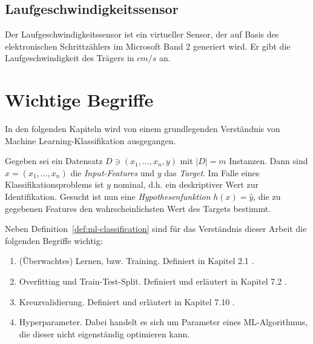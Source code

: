 \subsection{Laufgeschwindigkeitssensor}
Der Laufgeschwindigkeitssensor ist ein virtueller Sensor, der auf Basis des elektronischen Schrittzählers im Microsoft Band 2 generiert wird. Er gibt die Laufgeschwindigkeit des Trägers in $cm/s$ an.

\section{Wichtige Begriffe}
In den folgenden Kapiteln wird von einem grundlegenden Verständnis von Machine Learning-Klassifikation ausgegangen.

\begin{definition}[ML-Klassifikation]
\label{def:ml-classification}
Gegeben sei ein Datensatz $D \ni (x_1, ..., x_n, y)$ mit $|D| = m$ Instanzen. Dann sind $x = (x_1, ..., x_n)$ die \textit{Input-Features} und $y$ das \textit{Target}. Im Falle eines Klassifikationsproblems ist $y$ nominal, d.h. ein deskriptiver Wert zur Identifikation. Gesucht ist nun eine \textit{Hypothesenfunktion} $h(x) = \hat{y}$, die zu gegebenen Features den wahrscheinlichsten Wert des Targets bestimmt\cite{Ng2011a}.
\end{definition}
Neben Definition~\ref{def:ml-classification} sind für das Verständnis dieser Arbeit die folgenden Begriffe wichtig:
\begin{enumerate}
\item (Überwachtes) Lernen, bzw. Training. Definiert in Kapitel 2.1 \cite{Hastie2009}.
\item Overfitting und Train-Test-Split. Definiert und erläutert in Kapitel 7.2 \cite{Hastie2009}.
\item Kreuzvalidierung. Definiert und erläutert in Kapitel 7.10 \cite{Hastie2009}.
\item Hyperparameter.  Dabei handelt es sich um Parameter eines ML-Algorithmus, die dieser nicht eigenständig optimieren kann.
\end{enumerate}


